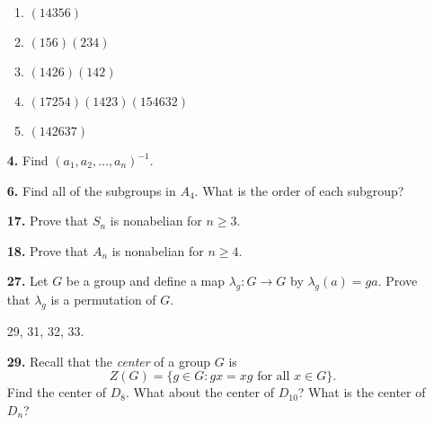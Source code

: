 \documentclass[12pt,reqno]{amsart}
\newcommand{\boldemph}{\emph}
\newcommand{\probskip}{\vskip1cm}
\begin{document}
\begin{enumerate}[{\bf 1.}]
\begin{multicols}{2}
\begin{enumerate}
\item
$(14356)$

 \item
$(156)(234)$
 
 \item
$(1426)(142)$
 
 \item
$(17254)(1423)(154632)$
 
 \item
$(142637)$
 
\end{enumerate}
\end{multicols}

\probskip
 
\item[{\bf 4.}] 
Find $(a_1, a_2, \ldots, a_n)^{-1}$.

\probskip
 
\item[{\bf 6.}] 
Find all of the subgroups in $A_4$. What is the order of each
subgroup? 
 
\probskip

\item[{\bf 17.}] 
Prove that $S_n$ is nonabelian for $n \geq 3$.

\probskip
 
\item[{\bf 18.}] 
Prove that $A_n$ is nonabelian for $n \geq 4$.

\probskip
 
\item[{\bf 27.}] 
Let $G$ be a group and define a map $\lambda_g : G \rightarrow G$ by
$\lambda_g(a) = g a$.  Prove that $\lambda_g$ is a permutation of $G$.

\newpage

 29, 31, 32, 33.  
\\

\item[{\bf 29.}]  %
Recall that the \boldemph{center} of a group $G$ is
\[
Z(G) = \{ g \in G : \mbox{$gx = xg$ for all $x \in G$} \}.
\]
Find the center of $D_8$. What about the center of $D_{10}$? What is
the center of $D_n$? 
 

\end{enumerate}
\end{document}
